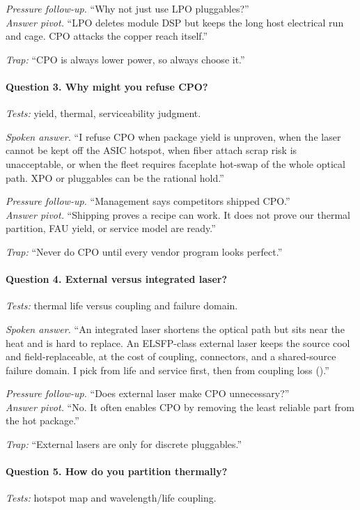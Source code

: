 \textit{Pressure follow-up.} ``Why not just use LPO pluggables?''\\
\textit{Answer pivot.} ``LPO deletes module DSP but keeps the long host
electrical run and cage. CPO attacks the copper reach itself.''

\textit{Trap:} ``CPO is always lower power, so always choose it.''

\paragraph{Question 3. Why might you refuse CPO?}
\textit{Tests:} yield, thermal, serviceability judgment.

\textit{Spoken answer.}
``I refuse CPO when package yield is unproven, when the laser cannot be kept
off the ASIC hotspot, when fiber attach scrap risk is unacceptable, or when
the fleet requires faceplate hot-swap of the whole optical path. XPO or
pluggables can be the rational hold.''

\textit{Pressure follow-up.} ``Management says competitors shipped CPO.''\\
\textit{Answer pivot.} ``Shipping proves a recipe can work. It does not prove
our thermal partition, FAU yield, or service model are ready.''

\textit{Trap:} ``Never do CPO until every vendor program looks perfect.''

\paragraph{Question 4. External versus integrated laser?}
\textit{Tests:} thermal life versus coupling and failure domain.

\textit{Spoken answer.}
``An integrated laser shortens the optical path but sits near the heat and is
hard to replace. An ELSFP-class external laser keeps the source cool and
field-replaceable, at the cost of coupling, connectors, and a shared-source
failure domain. I pick from life and service first, then from coupling loss
().''

\textit{Pressure follow-up.} ``Does external laser make CPO unnecessary?''\\
\textit{Answer pivot.} ``No. It often enables CPO by removing the least
reliable part from the hot package.''

\textit{Trap:} ``External lasers are only for discrete pluggables.''

\paragraph{Question 5. How do you partition thermally?}
\textit{Tests:} hotspot map and wavelength/life coupling.

